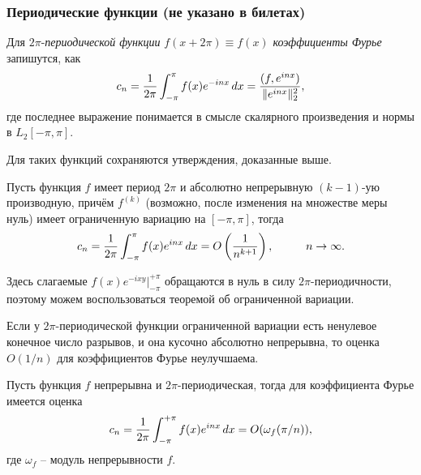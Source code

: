 \subsubsection*{Периодические функции (не указано в билетах)}


\begin{to_def}
    Для $2\pi$-\textit{периодической функции}  $f(x+2\pi) \equiv f(x)$ \textit{коэффициенты Фурье}  запишутся, как
    \begin{equation*}
        c_n = \frac{1}{2\pi} \int_{-\pi}^{\pi} 
        f(x) e^{-inx} \, d x = 
        \frac{
        (f, e^{inx})
        }{
        \|e^{inx}\|_2^2
        },
    \end{equation*}
    где последнее выражение понимается в смысле скалярного произведения и нормы в $L_2 [-\pi, \pi]$.
\end{to_def}

Для таких функций сохраняются утверждения, доказанные выше.

\begin{to_thr}[]
    Пусть функция $f$ имеет период $2 \pi$ и абсолютно непрерывную $(k-1)$-ую производную, причём $f^(k)$ (возможно, после изменения на множестве меры нуль) имеет ограниченную вариацию на $[-\pi, \pi]$, тогда
    \begin{equation*}
        c_n = \frac{1}{2\pi} \int_{-\pi}^{\pi} f(x) e^{inx} \, d x =
        O\left(\frac{1}{n^{k+1}}\right),
        \hspace{1 cm}
        n \to \infty.
    \end{equation*}
\end{to_thr}


\begin{uproof}
Здесь слагаемые $f(x) e^{-ixy} |_{-\pi}^{+\pi}$ обращаются в нуль в силу $2\pi$-периодичности, поэтому можем воспользоваться теоремой об ограниченной вариации. 
\end{uproof}

\begin{to_lem}
    Если у $2\pi$-периодической функции ограниченной вариации есть ненулевое конечное число разрывов, и она кусочно абсолютно непрерывна, то оценка $O(1/n)$ для коэффициентов Фурье неулучшаема.
\end{to_lem}


\begin{to_thr}[]
    Пусть функция $f$ непрерывна и $2\pi$-периодическая, тогда для коэффициента Фурье имеется оценка
    \begin{equation*}
        c_n =
        \frac{1}{2\pi} \int_{-\pi}^{+\pi} f(x) e^{inx} \, d x
        = O(\omega_f (\pi/n)),
    \end{equation*}
    где $\omega_f$ -- модуль непрерывности $f$.
\end{to_thr}


